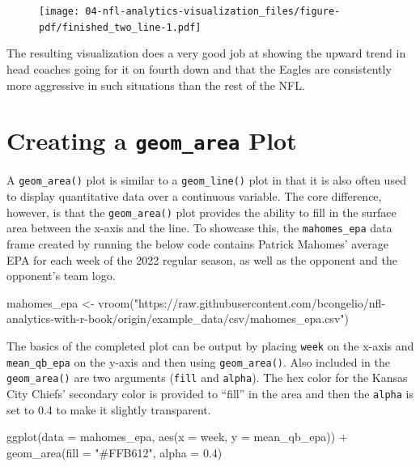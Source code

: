 \documentclass[
  letterpaper,
]{krantz}
\newenvironment{Shaded}{\begin{snugshade}}{\end{snugshade}}
\newcommand{\AttributeTok}[1]{\textcolor[rgb]{0.40,0.45,0.13}{#1}}
\newcommand{\FloatTok}[1]{\textcolor[rgb]{0.68,0.00,0.00}{#1}}
\newcommand{\FunctionTok}[1]{\textcolor[rgb]{0.28,0.35,0.67}{#1}}
\newcommand{\NormalTok}[1]{\textcolor[rgb]{0.00,0.23,0.31}{#1}}
\newcommand{\OtherTok}[1]{\textcolor[rgb]{0.00,0.23,0.31}{#1}}
\newcommand{\SpecialCharTok}[1]{\textcolor[rgb]{0.37,0.37,0.37}{#1}}
\newcommand{\StringTok}[1]{\textcolor[rgb]{0.13,0.47,0.30}{#1}}
\begin{document}
\begin{figure}[H]

{\centering \texttt{[image: 04-nfl-analytics-visualization\_files/figure-pdf/finished\_two\_line-1.pdf]}

}

\end{figure}

The resulting visualization does a very good job at showing the upward
trend in head coaches going for it on fourth down and that the Eagles
are consistently more aggressive in such situations than the rest of the
NFL.

\hypertarget{creating-a-geom_area-plot}{%
\section{\texorpdfstring{Creating a \texttt{geom\_area}
Plot}{Creating a geom\_area Plot}}\label{creating-a-geom_area-plot}}

A \texttt{geom\_area()} plot is similar to a \texttt{geom\_line()} plot
in that it is also often used to display quantitative data over a
continuous variable. The core difference, however, is that the
\texttt{geom\_area()} plot provides the ability to fill in the surface
area between the x-axis and the line. To showcase this, the
\texttt{mahomes\_epa} data frame created by running the below code
contains Patrick Mahomes' average EPA for each week of the 2022 regular
season, as well as the opponent and the opponent's team logo.

\begin{Shaded}
\begin{Highlighting}[]
\NormalTok{mahomes\_epa }\OtherTok{\textless{}{-}}
  \FunctionTok{vroom}\NormalTok{(}\StringTok{"https://raw.githubusercontent.com/bcongelio/nfl{-}analytics{-}with{-}r{-}book/origin/example\_data/csv/mahomes\_epa.csv"}\NormalTok{)}
\end{Highlighting}
\end{Shaded}

The basics of the completed plot can be output by placing \texttt{week}
on the x-axis and \texttt{mean\_qb\_epa} on the y-axis and then using
\texttt{geom\_area()}. Also included in the \texttt{geom\_area()} are
two arguments (\texttt{fill} and \texttt{alpha}). The hex color for the
Kansas City Chiefs' secondary color is provided to ``fill'' in the area
and then the \texttt{alpha} is set to 0.4 to make it slightly
transparent.

\begin{Shaded}
\begin{Highlighting}[]
\FunctionTok{ggplot}\NormalTok{(}\AttributeTok{data =}\NormalTok{ mahomes\_epa, }\FunctionTok{aes}\NormalTok{(}\AttributeTok{x =}\NormalTok{ week, }\AttributeTok{y =}\NormalTok{ mean\_qb\_epa)) }\SpecialCharTok{+}
  \FunctionTok{geom\_area}\NormalTok{(}\AttributeTok{fill =} \StringTok{"\#FFB612"}\NormalTok{, }\AttributeTok{alpha =} \FloatTok{0.4}\NormalTok{)}
\end{Highlighting}
\end{Shaded}
\end{document}
